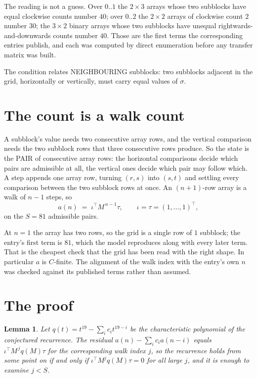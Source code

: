 \documentclass[11pt,a4paper]{article}
\theoremstyle{plain}
\newtheorem{lemma}[theorem]{Lemma}
\theoremstyle{definition}
\begin{document}
The reading is not a guess. Over $0..1$ the $2\times3$ arrays whose two subblocks have equal
clockwise counts number $40$; over $0..2$ the $2\times2$ arrays of clockwise count $2$ number
$30$; the $3\times2$ binary arrays whose two subblocks have unequal rightwards-and-downwards
counts number $40$. Those are the first terms the corresponding entries publish, and each was
computed by direct enumeration before any transfer matrix was built.

The condition relates NEIGHBOURING subblocks: two subblocks adjacent in the grid, horizontally
or vertically, must carry equal values of $\sigma$.

\section{The count is a walk count}

A subblock's value needs two consecutive array rows, and the vertical
comparison needs the two subblock rows that three consecutive rows produce. So the state is the
PAIR of consecutive array rows: the horizontal comparisons decide which pairs are admissible at
all, the vertical ones decide which pair may follow which. A step appends one array row,
turning $(r,s)$ into $(s,t)$ and settling every comparison between the two subblock rows at
once. An $(n+1)$-row array is a walk of $n-1$ steps, so
\[
a(n)\;=\;\iota^{\!\top}M^{\,n-1}\tau,\qquad\iota=\tau=(1,\dots,1)^{\!\top},
\]
on the $S=81$ admissible pairs.

At $n=1$ the array has two rows, so the grid is a single row of $1$
subblock; the entry's first term is $81$, which the model
reproduces along with every later term. That is the cheapest check that the grid has been read
with the right shape.
In particular $a$ is $C$-finite. The alignment of the walk index with the entry's own $n$ was
checked against its published terms rather than assumed.

\section{The proof}

\begin{lemma}\label{lem:crit}
Let $q(t)=t^{19}-\sum_i c_it^{19-i}$ be the characteristic polynomial of the
conjectured recurrence. The residual $a(n)-\sum_ic_ia(n-i)$ equals
$\iota^{\!\top}M^{\,j}q(M)\tau$ for the corresponding walk index $j$, so the recurrence
holds from some point on if and only if $\iota^{\!\top}M^{j}q(M)\tau=0$ for all large $j$,
and it is enough to examine $j<S$.
\end{lemma}
\end{document}
